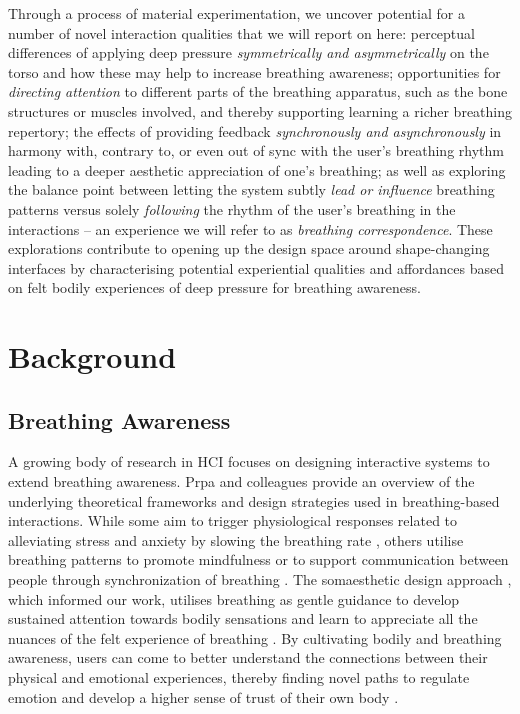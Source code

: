 Through a process of material experimentation, we uncover potential for a number of novel interaction qualities that we will report on here: perceptual differences of applying deep pressure \textit{symmetrically and asymmetrically} on the torso and how these may help to increase breathing awareness; opportunities for \textit{directing attention} to different parts of the breathing apparatus, such as the bone structures or muscles involved, and thereby supporting learning a richer breathing repertory; the effects of providing feedback \textit{synchronously and asynchronously} in harmony with, contrary to, or even out of sync with the user's breathing rhythm leading to a deeper aesthetic appreciation of one's breathing; as well as exploring the balance point between letting the system subtly \textit{lead or influence} breathing patterns versus solely \textit{following} the rhythm of the user's breathing in the interactions -- an experience we will refer to as \textit{breathing correspondence}. These explorations contribute to opening up the design space around shape-changing interfaces by characterising potential experiential qualities and affordances based on felt bodily experiences of deep pressure for breathing awareness.


\section{Background}

\subsection*{Breathing Awareness}

A growing body of research in HCI focuses on designing interactive systems to extend breathing awareness. Prpa and colleagues \cite{prpa_inhaling_2020} provide an overview of the underlying theoretical frameworks and design strategies used in breathing-based interactions. While some aim to trigger physiological responses related to alleviating stress and anxiety by slowing the breathing rate \cite{van_rooij_deep_2016, bumatay_investigating_2017, parnandi_chill-out_2014}, others utilise breathing patterns to promote mindfulness \cite{pisa_towards_2017, shamekhi_breathe_2018} or to support communication between people through synchronization of breathing \cite{desnoyers-stewart_jel_2019,kim_breathingframe_2015}. The somaesthetic design approach \cite{hook_designing_2018}, which informed our work, utilises breathing as gentle guidance to develop sustained attention towards bodily sensations and learn to appreciate all the nuances of the felt experience of breathing \cite{prpa_attending_2018, stahl_soma_2016}. By cultivating bodily and breathing awareness, users can come to better understand the connections between their physical and emotional experiences, thereby finding novel paths to regulate emotion and develop a higher sense of trust of their own body \cite{bornemann_differential_2015}.

